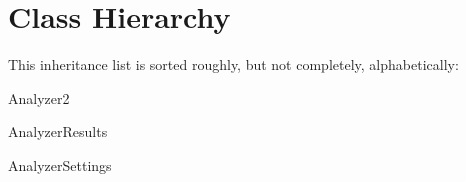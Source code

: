 \section{Class Hierarchy}
This inheritance list is sorted roughly, but not completely, alphabetically\+:\begin{DoxyCompactList}
\item Analyzer2\begin{DoxyCompactList}
\item {}
\end{DoxyCompactList}
\item Analyzer\+Results\begin{DoxyCompactList}
\item {}
\end{DoxyCompactList}
\item Analyzer\+Settings\begin{DoxyCompactList}
\item {}
\end{DoxyCompactList}
\item {}
\end{DoxyCompactList}
